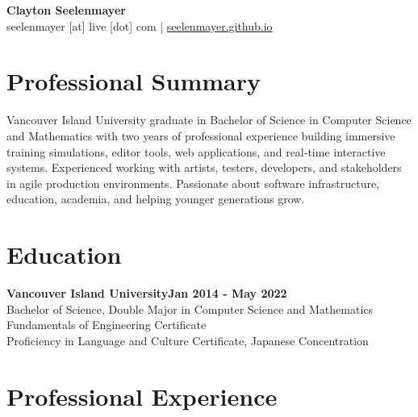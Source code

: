 \documentclass[10pt]{article}
\begin{document}

\begin{center}
	{\LARGE\textbf{Clayton Seelenmayer}}\\[3pt]
	seelenmayer [at] live [dot] com
	\quad|\quad
	\href{https://seelenmayer.github.io}{seelenmayer.github.io}
\end{center}

\vspace{-4pt}

\section*{Professional Summary}

Vancouver Island University graduate in Bachelor of Science in Computer Science and Mathematics with two years of professional experience building immersive training simulations, editor tools, web applications, and real-time interactive systems. Experienced working with artists, testers, developers, and stakeholders in agile production environments. Passionate about software infrastructure, education, academia, and helping younger generations grow.

\section*{Education}

\textbf{Vancouver Island University}\hfill \textbf{Jan 2014 - May 2022}\\
Bachelor of Science, Double Major in Computer Science and Mathematics\\
Fundamentals of Engineering Certificate\\
Proficiency in Language and Culture Certificate, Japanese Concentration

\section*{Professional Experience}
\end{document}
